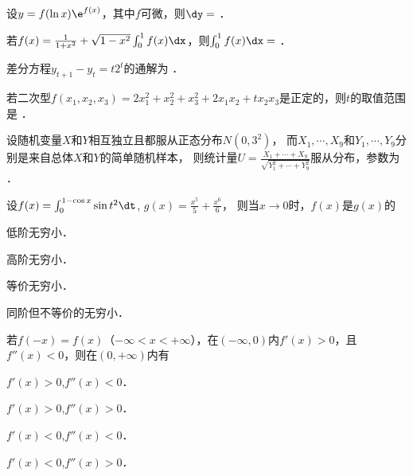 \documentclass[plain,noanswer,medmath]{../../template/jnuexam}
\begin{document}






\begin{problem}
设$y = f(\ln x) \e^{f(x)}$，其中$f$可微，则$\dy =$ \fillin{}．
\end{problem}


\begin{problem}
若$f(x) = \frac{1}{1 + x^2} + \sqrt{1 - x^2} \int_0^1f(x)\dx$，则$\int_0^1f(x)\dx =$ \fillin{}．
\end{problem}


\begin{problem}
差分方程$y_{t + 1} - y_t = t2^t$的通解为 \fillin{}．
\end{problem}


\begin{problem}
若二次型$f(x_1,x_2,x_3) = 2x_1^2+ x_2^2+ x_3^2+ 2x_1x_2 + tx_2x_3$是正定的，则$t$的取值范围是 \fillin{}．
\end{problem}


\begin{problem}
设随机变量$X$和$Y$相互独立且都服从正态分布$N(0,3^2)$，
而$X_1, \cdots ,X_9$和$Y_1, \cdots ,Y_9$分别是来自总体$X$和$Y$的简单随机样本，
则统计量$U = \frac{X_1 + \cdots + X_9}{\sqrt{Y_1^2+ \cdots + Y_9^2}}$服从分布\fillin{}，参数为 \fillin{}．
\end{problem}




\begin{problem}
设$f(x) = \int_0^{1 - \cos x} \sin t^2 \dt$, $g(x) = \frac{x^5}{5} + \frac{x^6}{6}$，
则当$x \to 0$时，$f(x)$是$g(x)$的\pickout{}
\begin{abcd}
\item 低阶无穷小．                    
\item 高阶无穷小．
\item 等价无穷小．                    
\item 同阶但不等价的无穷小．
\end{abcd}
\end{problem}


\begin{problem}
若$f(- x) = f(x)$（$-\infty < x < +\infty$），在$(-\infty ,0)$内$f'(x) > 0$，且$f''(x) < 0$，则在$(0, +\infty)$内有\pickout{}
\begin{abcd}
\item $f'(x) > 0$,$f''(x) < 0$．
\item $f'(x) > 0$,$f''(x) > 0$．
\item $f'(x) < 0$,$f''(x) < 0$．
\item $f'(x) < 0$,$f''(x) > 0$．
\end{abcd}
\end{problem}
\end{document}
